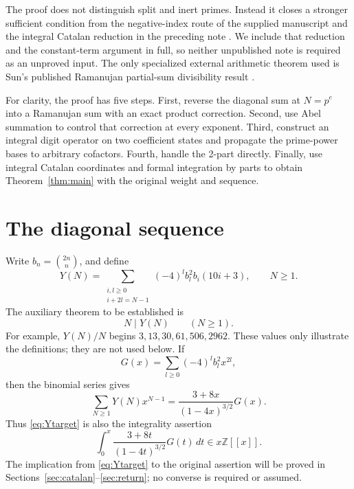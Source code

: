 \documentclass[11pt,a4paper]{article}
\theoremstyle{remark}\newtheorem{remark}[theorem]{Remark}
\newcommand{\Z}{\mathbb Z}\newcommand{\Q}{\mathbb Q}
\begin{document}
The proof does not distinguish split and inert primes. Instead it
closes a stronger sufficient condition from the negative-index route
of the supplied manuscript \cite{Supplied} and the integral Catalan
reduction in the preceding note \cite{Previous}. We include that
reduction and the constant-term argument in full, so neither unpublished
note is required as an unproved input.
The only specialized external arithmetic theorem used is Sun's
published Ramanujan partial-sum divisibility result
\cite[Theorem~5, (5)]{Sun2013}.

For clarity, the proof has five steps. First, reverse the diagonal
sum at \(N=p^e\) into a Ramanujan sum with an exact product correction.
Second, use Abel summation to control that correction at every
exponent. Third, construct an integral digit operator on two coefficient
states and propagate the prime-power bases to arbitrary cofactors.
Fourth, handle the 2-part directly. Finally, use integral Catalan
coordinates and formal integration by parts to obtain
Theorem~\ref{thm:main} with the original weight and sequence.

\section{The diagonal sequence}\label{sec:diagonal}

Write \(b_n=\binom{2n}{n}\), and define
\begin{equation}\label{eq:diagonal}
 Y(N)=\sum_{\substack{i,l\ge0\\i+2l=N-1}}
          (-4)^l b_l^2 b_i(10i+3),\qquad N\ge1.
\end{equation}
The auxiliary theorem to be established is
\begin{equation}\label{eq:Ytarget}
                         N\mid Y(N)\qquad(N\ge1).
\end{equation}
For example, \(Y(N)/N\) begins
\(3,13,30,61,506,2962\).
These values only illustrate the definitions; they are not used below.
If
\[
 G(x)=\sum_{l\ge0}(-4)^l b_l^2 x^{2l},
\]
then the binomial series gives
\begin{equation}\label{eq:Ygenerator}
 \sum_{N\ge1}Y(N)x^{N-1}
       =\frac{3+8x}{(1-4x)^{3/2}}G(x).
\end{equation}
Thus \eqref{eq:Ytarget} is also the integrality assertion
\[
 \int_0^x\frac{3+8t}{(1-4t)^{3/2}}G(t)\,dt\in x\Z[[x]].
\]
The implication from \eqref{eq:Ytarget} to the original assertion will
be proved in Sections~\ref{sec:catalan}--\ref{sec:return}; no converse
is required or assumed.
\end{document}
